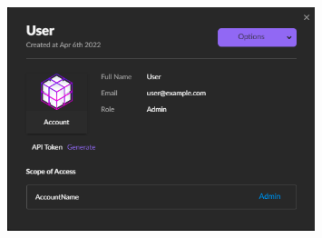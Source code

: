 \begin{figure}[htbp]
      \centering
      \includegraphics[width=0.8\textwidth]{Figures/SentinelOne/createToken.png}
\end{figure}

